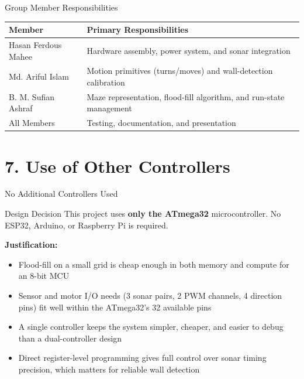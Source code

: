 \documentclass[aspectratio=169,11pt]{beamer}
\newcommand{\highlight}[1]{\textcolor{teal!80!black}{\textbf{#1}}}
\begin{document}
\begin{frame}{Group Member Responsibilities}
    \begin{table}
        \centering
        \footnotesize
        \begin{tabular}{@{}lp{7.5cm}@{}}
            \toprule
            \textbf{Member} & \textbf{Primary Responsibilities} \\
            \midrule
            Hasan Ferdous Mahee & Hardware assembly, power system, and sonar integration \\
            Md. Ariful Islam & Motion primitives (turns/moves) and wall-detection calibration \\
            B. M. Sufian Ashraf & Maze representation, flood-fill algorithm, and run-state management \\
            All Members & Testing, documentation, and presentation \\
            \bottomrule
        \end{tabular}
    \end{table}
\end{frame}

\section{7. Use of Other Controllers}
\begin{frame}{No Additional Controllers Used}
    \begin{block}{Design Decision}
        This project uses \highlight{only the ATmega32} microcontroller. No ESP32, Arduino, or Raspberry Pi is required.
    \end{block}

    \vspace{0.3cm}
    \textbf{Justification:}
    \begin{itemize}
        \item Flood-fill on a small grid is cheap enough in both memory and compute for an 8-bit MCU
        \item Sensor and motor I/O needs (3 sonar pairs, 2 PWM channels, 4 direction pins) fit well within the ATmega32's 32 available pins
        \item A single controller keeps the system simpler, cheaper, and easier to debug than a dual-controller design
        \item Direct register-level programming gives full control over sonar timing precision, which matters for reliable wall detection
    \end{itemize}
\end{frame}
\end{document}
